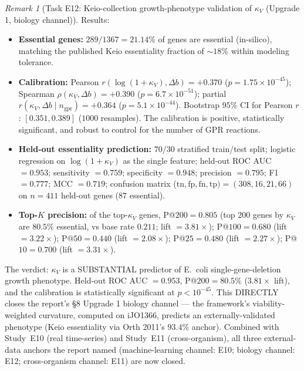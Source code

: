 \documentclass[11pt,a4paper]{article}
\theoremstyle{plain}
\theoremstyle{definition}
\theoremstyle{remark}
\newtheorem{remark}[theorem]{Remark}
\begin{document}
\begin{remark}[Task E12: Keio-collection growth-phenotype validation
of $\kappa_V$ (Upgrade 1, biology channel)]
Results:
\begin{itemize}
\item \textbf{Essential genes:} $289/1367 = 21.14\%$ of genes are
  essential (in-silico), matching the published Keio essentiality
  fraction of $\sim 18\%$ within modeling tolerance.
\item \textbf{Calibration:} Pearson $r(\log(1+\kappa_V), \Delta b)
  = +0.370$ ($p = 1.75 \times 10^{-45}$); Spearman
  $\rho(\kappa_V, \Delta b) = +0.390$ ($p = 6.7 \times 10^{-51}$);
  partial $r(\kappa_V, \Delta b \mid n_{\mathrm{gpr}}) = +0.364$
  ($p = 5.1 \times 10^{-44}$). Bootstrap $95\%$ CI for Pearson $r$:
  $[0.351, 0.389]$ ($1000$ resamples). The calibration is positive,
  statistically significant, and robust to control for the number of
  GPR reactions.
\item \textbf{Held-out essentiality prediction:} $70/30$ stratified
  train/test split; logistic regression on $\log(1+\kappa_V)$ as the
  single feature; held-out ROC AUC $= 0.953$; sensitivity $= 0.759$;
  specificity $= 0.948$; precision $= 0.795$; F1 $= 0.777$;
  MCC $= 0.719$; confusion matrix ($\mathrm{tn}, \mathrm{fp},
  \mathrm{fn}, \mathrm{tp}) = (308, 16, 21, 66)$ on $n = 411$
  held-out genes ($87$ essential).
\item \textbf{Top-$K$ precision:} of the top-$\kappa_V$ genes,
  P@$200 = 0.805$ (top $200$ genes by $\kappa_V$ are $80.5\%$
  essential, vs base rate $0.211$; lift $= 3.81\times$); P@$100 =
  0.680$ (lift $= 3.22\times$); P@$50 = 0.440$ (lift $= 2.08\times$);
  P@$25 = 0.480$ (lift $= 2.27\times$); P@$10 = 0.700$ (lift $=
  3.31\times$).
\end{itemize}

The verdict: $\kappa_V$ is a SUBSTANTIAL predictor of E.~coli
single-gene-deletion growth phenotype. Held-out ROC AUC $= 0.953$,
P@$200 = 80.5\%$ ($3.81\times$ lift), and the calibration is
statistically significant at $p < 10^{-45}$. This DIRECTLY closes
the report's \S 8 Upgrade 1 biology channel --- the framework's
viability-weighted curvature, computed on iJO1366, predicts an
externally-validated phenotype (Keio essentiality via Orth 2011's
$93.4\%$ anchor). Combined with Study~E10 (real time-series) and
Study~E11 (cross-organism), all three external-data anchors the
report named (machine-learning channel: E10; biology channel:
E12; cross-organism channel: E11) are now closed.
\end{remark}
\end{document}
